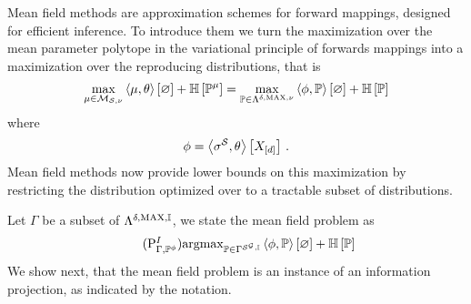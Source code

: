 Mean field methods are approximation schemes for forward mappings, designed for efficient inference.
To introduce them we turn the maximization over the mean parameter polytope in the variational principle of forwards mappings into a maximization over the reproducing distributions, that is
\begin{align*}
    \max_{\mu\in\mathcal{M}_{\mathcal{S},\nu}}  \left\langle \mu,\theta\right\rangle \left[ \varnothing \right] + \mathbb{H}\left[\mathbb{P}^{\mu}\right]
    =
    \max_{\mathbb{P}\in\Lambda^{\delta,\mathrm{MAX},\nu}} \left\langle \phi,\mathbb{P}\right\rangle \left[ \varnothing \right] + \mathbb{H}\left[\mathbb{P}\right]
\end{align*}
where
\begin{align*}
    \phi = \left\langle \sigma^{\mathcal{S}},\theta\right\rangle \left[ X_{[d]} \right] \, .
\end{align*}
Mean field methods now provide lower bounds on this maximization by restricting the distribution optimized over to a tractable subset of distributions.

Let $\Gamma$ be a subset of $\Lambda^{\delta,\mathrm{MAX},\mathbb{I}}$, we state the mean field problem as
\begin{align}
    \label{prob:meanField}\tag{$\probtagtypeinst{I}{\Gamma,\probof{\energytensor}}$}
    \argmax_{\probtensor\in \mnexpfamily} \contraction{\energytensor,\probtensor} + \sentropyof{\probtensor}
\end{align}
We show next, that the mean field problem is an instance of an information projection, as indicated by the notation.

